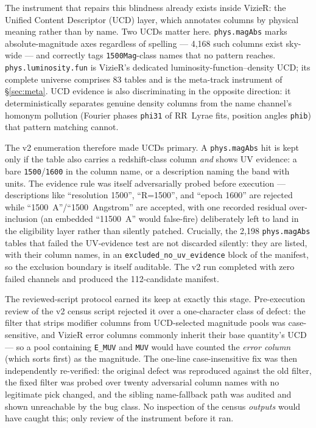 \documentclass[twocolumn]{aastex702}
\begin{document}
The instrument that repairs this blindness already exists inside VizieR: the Unified
Content Descriptor (UCD) layer, which annotates columns by physical meaning rather than
by name. Two UCDs matter here. \texttt{phys.magAbs} marks absolute-magnitude axes
regardless of spelling --- 4,168 such columns exist sky-wide --- and correctly tags
\texttt{1500Mag}-class names that no pattern reaches. \texttt{phys.luminosity.fun} is
VizieR's dedicated luminosity-function--density UCD; its complete universe comprises 83
tables and is the meta-track instrument of \S\ref{sec:meta}. UCD evidence is also
discriminating in the opposite direction: it deterministically separates genuine density
columns from the name channel's homonym pollution (Fourier phases \texttt{phi31} of
RR~Lyrae fits, position angles \texttt{phib}) that pattern matching cannot.

The v2 enumeration therefore made UCDs primary. A \texttt{phys.magAbs} hit is kept only
if the table also carries a redshift-class column \emph{and} shows UV evidence: a bare
\texttt{1500}/\texttt{1600} in the column name, or a description naming the band with
units. The evidence rule was itself adversarially probed before execution ---
descriptions like ``resolution 1500'', ``R=1500'', and ``epoch 1600'' are rejected while
``1500~A''/``1500~Angstrom'' are accepted, with one recorded residual over-inclusion
(an embedded ``11500~A'' would false-fire) deliberately left to land in the eligibility
layer rather than silently patched. Crucially, the 2,198 \texttt{phys.magAbs} tables
that failed the UV-evidence test are not discarded silently: they are listed, with their
column names, in an \texttt{excluded\_no\_uv\_evidence} block of the manifest, so the
exclusion boundary is itself auditable. The v2 run completed with zero failed channels
and produced the 112-candidate manifest.

The reviewed-script protocol earned its keep at exactly this stage. Pre-execution
review of the v2 census script rejected it over a one-character class of defect: the
filter that strips modifier columns from UCD-selected magnitude pools was
case-sensitive, and VizieR error columns commonly inherit their base quantity's UCD ---
so a pool containing \texttt{E\_MUV} and \texttt{MUV} would have counted the
\emph{error column} (which sorts first) as the magnitude. The one-line
case-insensitive fix was then independently re-verified: the original defect was
reproduced against the old filter, the fixed filter was probed over twenty adversarial
column names with no legitimate pick changed, and the sibling name-fallback path was
audited and shown unreachable by the bug class. No inspection of the census
\emph{outputs} would have caught this; only review of the instrument before it ran.
\end{document}
